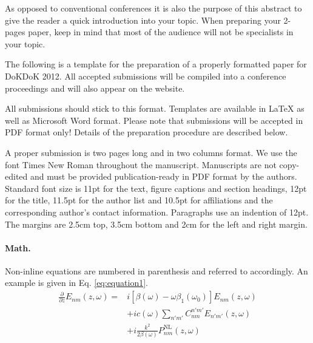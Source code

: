 \documentclass[a4paper, 11pt]{article}
\begin{document}

\begin{abstract}
\noindent \bfseries{}
\end{abstract}

\begin{multicols}{2}

As opposed to conventional conferences it is also the purpose of this abstract to give the reader a quick introduction into your topic. When preparing your 2-pages paper, keep in mind that most of the audience will not be specialists in your topic. 

The following is a template for the preparation of a properly formatted paper for DoKDoK 2012. All accepted submissions will be compiled into a conference proceedings and will also appear on the website.

All submissions should stick to this format. Templates are available in \LaTeX{} as well as Microsoft Word format. Please note that submissions will be accepted in PDF format only! Details of the preparation procedure are described below.


A proper submission is two pages long and in two columns format. 
We use the font Times New Roman throughout the manuscript.
Manuscripts are not copy-edited and must be provided publication-ready in PDF format by the authors.
Standard font size is 11pt for the text, figure captions and section headings, 12pt for the title, 11.5pt for the author list and 10.5pt for affiliations and the corresponding author's contact information.
Paragraphs use an indention of 12pt.
The margins are 2.5cm top, 3.5cm bottom and 2cm for the left and right margin.

\paragraph{Math.} Non-inline equations are numbered in parenthesis and referred to accordingly. An example is given in Eq. \eqref{eq:equation1}.
\begin{align}
\frac{\partial}{\partial z}E_{nm}(z,\omega)=&i\left[\beta(\omega)-\omega\beta_1(\omega_0) \right]E_{nm}(z,\omega)\nonumber\\
&+ic(\omega)\sum_{n' m'}C_{nm}^{n'm'}E_{n'm'}(z,\omega)\nonumber\\
&+i\frac{k^2}{2\beta(\omega)}P_{nm}^\text{NL}(z,\omega)\label{eq:equation1}
\end{align}


\end{multicols}
\end{document}
